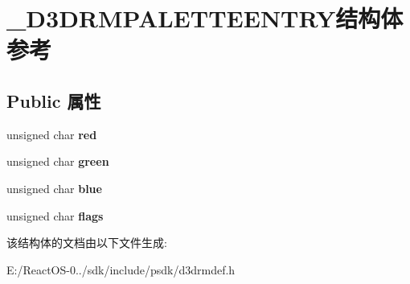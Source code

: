 \hypertarget{struct___d3_d_r_m_p_a_l_e_t_t_e_e_n_t_r_y}{}\section{\+\_\+\+D3\+D\+R\+M\+P\+A\+L\+E\+T\+T\+E\+E\+N\+T\+R\+Y结构体 参考}
\label{struct___d3_d_r_m_p_a_l_e_t_t_e_e_n_t_r_y}
\subsection*{Public 属性}
\begin{DoxyCompactItemize}
\item 
\mbox{\label{struct___d3_d_r_m_p_a_l_e_t_t_e_e_n_t_r_y_aa243b3cd22cf0a195ce0cf7e163947e6}} 
unsigned char {\bfseries red}
\item 
\mbox{\label{struct___d3_d_r_m_p_a_l_e_t_t_e_e_n_t_r_y_a6911e593a08bb6c4a5545f0b1bc24b3c}} 
unsigned char {\bfseries green}
\item 
\mbox{\label{struct___d3_d_r_m_p_a_l_e_t_t_e_e_n_t_r_y_a073bdca527a289763df78f36564da6d1}} 
unsigned char {\bfseries blue}
\item 
\mbox{\label{struct___d3_d_r_m_p_a_l_e_t_t_e_e_n_t_r_y_ac085ba00a0b2cbb6b568ddbe2181c479}} 
unsigned char {\bfseries flags}
\end{DoxyCompactItemize}


该结构体的文档由以下文件生成\+:\begin{DoxyCompactItemize}
\item 
E\+:/\+React\+O\+S-\/0../sdk/include/psdk/d3drmdef.\+h\end{DoxyCompactItemize}
